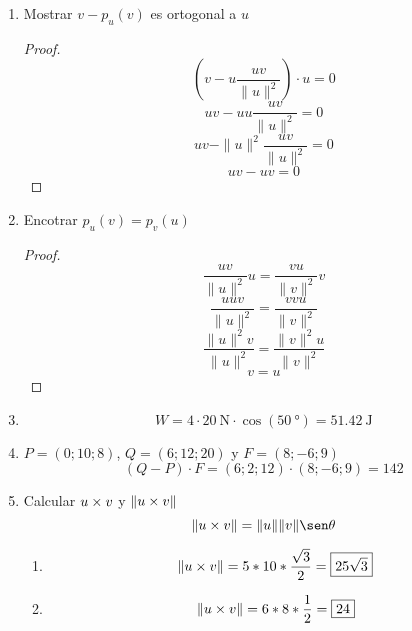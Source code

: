 \documentclass[../practica.root.tex]{subfiles}
\begin{document}
\begin{enumerate}
    \item Mostrar $v - p_u(v)$ es ortogonal a $u$
          \begin{proof}
              \[ \left(v - u\frac{uv}{\|u\|^2}\right)\cdot u = 0 \]
              \[ uv - uu\frac{uv}{\|u\|^2} = 0 \]
              \[ uv - \|u\|^2\frac{uv}{\|u\|^2} = 0 \]
              \[ uv - uv = 0 \]
          \end{proof}

    \item Encotrar $p_u(v) = p_v(u)$
          \begin{proof}
              \[ \frac{uv}{\|u\|^2}u = \frac{vu}{\|v\|^2}v \]
              \[ \frac{uuv}{\|u\|^2} = \frac{vvu}{\|v\|^2} \]
              \[ \frac{\|u\|^2v}{\|u\|^2} = \frac{\|v\|^2u}{\|v\|^2} \]
              \[ v = u \]
          \end{proof}

    \item
          \[ W = 4 \cdot \SI{20}{\newton} \cdot \cos(\SI{50}{\degree}) = \boxed{\SI{51,42}{\joule}}  \]

    \item  $P = (0; 10; 8)$, $Q = (6; 12; 20)$ y $F = (8; -6; 9)$
          \[ (Q - P)\cdot F = (6; 2; 12)\cdot(8; -6; 9) = \boxed{142} \]

    \item Calcular $u \times v$ y $\|u \times v\|$
          \[ \|u \x v\| = \|u\|\|v\|\sen\theta \]
          \begin{enumerate}
              \item
                    \[ \|u \times v\| = 5*10*\frac{\sqrt{3}}{2} = \boxed{25\sqrt{3}} \]
              \item
                    \[ \|u \times v\| = 6*8*\frac{1}{2} = \boxed{24} \]


\end{enumerate}
\end{enumerate}
\end{document}
